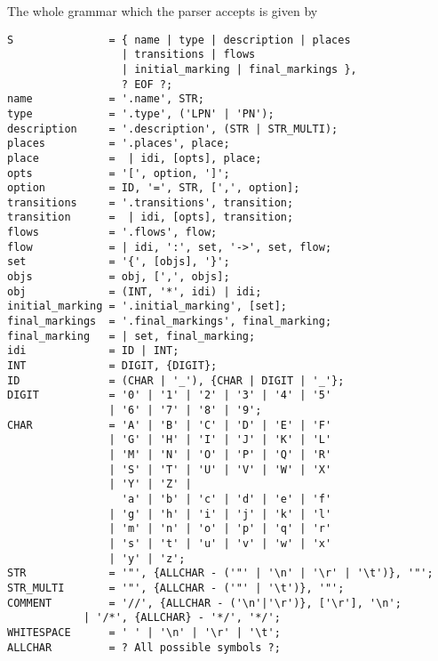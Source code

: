
The whole grammar which the parser accepts is given by 
\begin{lstlisting}[captionpos=b, caption=Grammar of the APT format for labelled Petri nets, label = lst:grammar,language=ebnf]
S               = { name | type | description | places 
                  | transitions | flows 
                  | initial_marking | final_markings },
                  ? EOF ?;
name            = '.name', STR;
type            = '.type', ('LPN' | 'PN');
description     = '.description', (STR | STR_MULTI);
places          = '.places', place;
place           =  | idi, [opts], place;
opts            = '[', option, ']';
option          = ID, '=', STR, [',', option];
transitions     = '.transitions', transition;
transition      =  | idi, [opts], transition;
flows           = '.flows', flow;
flow            = | idi, ':', set, '->', set, flow;
set             = '{', [objs], '}';
objs            = obj, [',', objs]; 
obj             = (INT, '*', idi) | idi;
initial_marking = '.initial_marking', [set];
final_markings  = '.final_markings', final_marking;
final_marking   = | set, final_marking;
idi             = ID | INT;
INT             = DIGIT, {DIGIT};
ID              = (CHAR | '_'), {CHAR | DIGIT | '_'};
DIGIT           = '0' | '1' | '2' | '3' | '4' | '5' 
                | '6' | '7' | '8' | '9';
CHAR            = 'A' | 'B' | 'C' | 'D' | 'E' | 'F'
                | 'G' | 'H' | 'I' | 'J' | 'K' | 'L'
                | 'M' | 'N' | 'O' | 'P' | 'Q' | 'R'
                | 'S' | 'T' | 'U' | 'V' | 'W' | 'X'
                | 'Y' | 'Z' |
                  'a' | 'b' | 'c' | 'd' | 'e' | 'f'
                | 'g' | 'h' | 'i' | 'j' | 'k' | 'l'
                | 'm' | 'n' | 'o' | 'p' | 'q' | 'r'
                | 's' | 't' | 'u' | 'v' | 'w' | 'x'
                | 'y' | 'z';
STR             = '"', {ALLCHAR - ('"' | '\n' | '\r' | '\t')}, '"';
STR_MULTI       = '"', {ALLCHAR - ('"' | '\t')}, '"';
COMMENT         = '//', {ALLCHAR - ('\n'|'\r')}, ['\r'], '\n';
	        | '/*', {ALLCHAR} - '*/', '*/';
WHITESPACE      = ' ' | '\n' | '\r' | '\t';
ALLCHAR         = ? All possible symbols ?;
\end{lstlisting}

